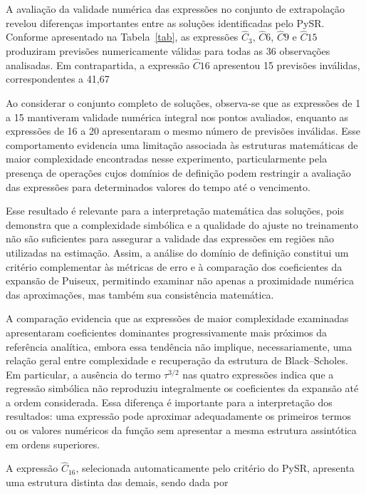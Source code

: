 A avaliação da validade numérica das expressões no conjunto de extrapolação revelou diferenças importantes entre as soluções identificadas pelo PySR. Conforme apresentado na Tabela~\ref{tab}, as expressões $\widehat{C}_3$, $\widehat{C}6$, $\widehat{C}9$ e $\widehat{C}{15}$ produziram previsões numericamente válidas para todas as 36 observações analisadas. Em contrapartida, a expressão $\widehat{C}{16}$ apresentou 15 previsões inválidas, correspondentes a 41,67%

Ao considerar o conjunto completo de soluções, observa-se que as expressões de 1 a 15 mantiveram validade numérica integral nos pontos avaliados, enquanto as expressões de 16 a 20 apresentaram o mesmo número de previsões inválidas. Esse comportamento evidencia uma limitação associada às estruturas matemáticas de maior complexidade encontradas nesse experimento, particularmente pela presença de operações cujos domínios de definição podem restringir a avaliação das expressões para determinados valores do tempo até o vencimento.

Esse resultado é relevante para a interpretação matemática das soluções, pois demonstra que a complexidade simbólica e a qualidade do ajuste no treinamento não são suficientes para assegurar a validade das expressões em regiões não utilizadas na estimação. Assim, a análise do domínio de definição constitui um critério complementar às métricas de erro e à comparação dos coeficientes da expansão de Puiseux, permitindo examinar não apenas a proximidade numérica das aproximações, mas também sua consistência matemática.

A comparação evidencia que as expressões de maior complexidade examinadas apresentaram coeficientes dominantes progressivamente mais próximos da referência analítica, embora essa tendência não implique, necessariamente, uma relação geral entre complexidade e recuperação da estrutura de Black--Scholes. Em particular, a ausência do termo $\tau^{3/2}$ nas quatro expressões indica que a regressão simbólica não reproduziu integralmente os coeficientes da expansão até a ordem considerada. Essa diferença é importante para a interpretação dos resultados: uma expressão pode aproximar adequadamente os primeiros termos ou os valores numéricos da função sem apresentar a mesma estrutura assintótica em ordens superiores.

A expressão $\widehat{C}_{16}$, selecionada
automaticamente pelo critério do PySR,
apresenta uma estrutura distinta das demais,
sendo dada por

